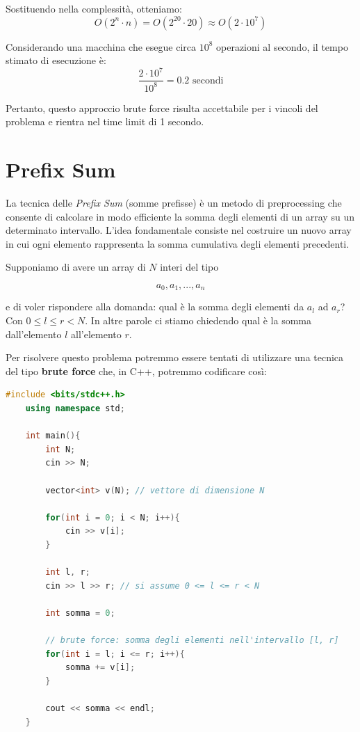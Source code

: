 Sostituendo nella complessità, otteniamo:
\[
O(2^n \cdot n) = O(2^{20} \cdot 20) \approx O(2 \cdot 10^7)
\]

Considerando una macchina che esegue circa \(10^8\) operazioni al secondo, il tempo stimato di esecuzione è:
\[
\frac{2 \cdot 10^7}{10^8} = 0.2 \text{ secondi}
\]

\noindent
Pertanto, questo approccio brute force risulta accettabile per i vincoli del problema e rientra nel time limit di 1 secondo.







\section{Prefix Sum}

La tecnica delle \textit{Prefix Sum} (somme prefisse) è un metodo di preprocessing che consente di calcolare in modo efficiente la somma degli elementi di un array su un determinato intervallo.  
L’idea fondamentale consiste nel costruire un nuovo array in cui ogni elemento rappresenta la somma cumulativa degli elementi precedenti.

\vspace{0.5cm}

Supponiamo di avere un array di $N$ interi del tipo

\begin{equation*}
	a_0, a_1, ... , a_n
\end{equation*}

e di voler rispondere alla domanda: qual è la somma degli elementi da $a_l$ ad $a_r$? Con $0 \le l \le r < N$.
In altre parole ci stiamo chiedendo qual è la somma dall'elemento $l$ all'elemento $r$.

Per risolvere questo problema potremmo essere tentati di utilizzare una tecnica del tipo \textbf{brute force} che, in C++, potremmo codificare così:

\begin{lstlisting}[language=C++]
	#include <bits/stdc++.h>
	using namespace std;
	
	int main(){
		int N;
		cin >> N;
		
		vector<int> v(N); // vettore di dimensione N
		
		for(int i = 0; i < N; i++){
			cin >> v[i];
		}
		
		int l, r;
		cin >> l >> r; // si assume 0 <= l <= r < N
		
		int somma = 0;
		
		// brute force: somma degli elementi nell'intervallo [l, r]
		for(int i = l; i <= r; i++){
			somma += v[i];
		}
		
		cout << somma << endl;
	}
\end{lstlisting}

